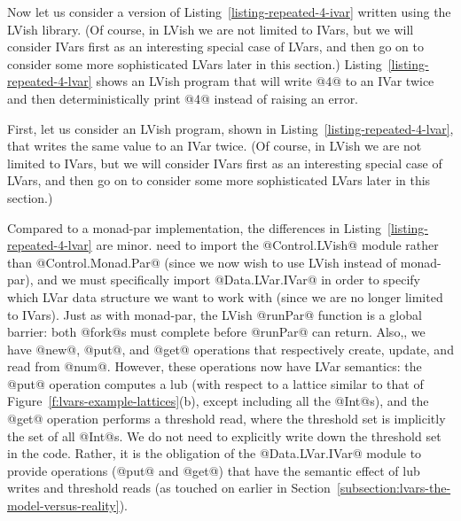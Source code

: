 \singlespacing

\doublespacing

Now let us consider a version of Listing~\ref{listing-repeated-4-ivar}
written using the LVish library. (Of course, in LVish we are not
limited to IVars, but we will consider IVars first as an interesting
special case of LVars, and then go on to consider some more
sophisticated LVars later in this section.)
Listing~\ref{listing-repeated-4-lvar} shows an LVish program that will
write @4@ to an IVar twice and then deterministically print @4@
instead of raising an error.
\fi

\ifdefined\JOURNAL
First, let us consider an LVish program, shown in
Listing~\ref{listing-repeated-4-lvar}, that writes the same value to
an IVar twice.  (Of course, in LVish we are not limited to IVars, but
we will consider IVars first as an interesting special case of LVars,
and then go on to consider some more sophisticated LVars later in this
section.)
\fi

\singlespacing

\doublespacing

\ifdefined\JOURNAL
Compared to a monad-par implementation, the differences in
Listing~\ref{listing-repeated-4-lvar} are minor.
\fi
{} need to
import the @Control.LVish@ module rather than @Control.Monad.Par@
(since we now wish to use LVish instead of monad-par), and we must
specifically import @Data.LVar.IVar@ in order to specify which LVar
data structure we want to work with (since we are no longer limited to
IVars).  Just as with monad-par, the LVish @runPar@ function is a
global barrier: both @fork@s must complete before @runPar@ can return.
Also,, we have @new@, @put@, and
@get@ operations that respectively create, update, and read from
@num@.  However, these operations now have LVar semantics: the @put@
operation computes a lub (with respect to a lattice similar to that of
Figure~\ref{f:lvars-example-lattices}(b), except including all the
@Int@s), and the @get@ operation performs a threshold read, where the
threshold set is implicitly the set of all @Int@s.  We do not need to
explicitly write down the threshold set in the code.  Rather, it is the
obligation of the @Data.LVar.IVar@ module to provide operations (@put@
and @get@) that have the semantic effect of lub writes and threshold
reads (as  touched on earlier in
Section~\ref{subsection:lvars-the-model-versus-reality}).

